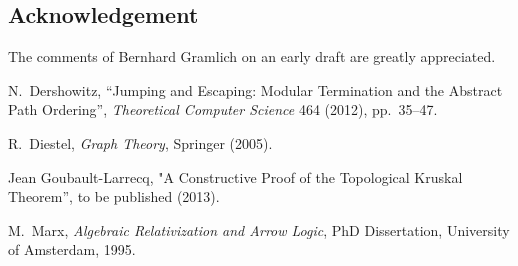 \documentclass{llncs}
\begin{document}
\subsection*{Acknowledgement}
The comments of
Bernhard Gramlich
on an early draft are greatly appreciated.

\begin{thebibliography}{9}
N.\ Dershowitz, ``Jumping and Escaping: Modular Termination and the Abstract Path Ordering'', \textit{Theoretical Computer Science} 464 (2012),
pp.\ 35--47.

R.\ Diestel, \emph{Graph Theory}, Springer (2005).

 Jean Goubault-Larrecq, "A Constructive Proof of the
  Topological Kruskal Theorem'', to be published (2013).

M.\ Marx,
  \emph{Algebraic Relativization and Arrow Logic}, PhD Dissertation,
  University of Amsterdam, 1995.
  
\end{thebibliography}
\end{document}
